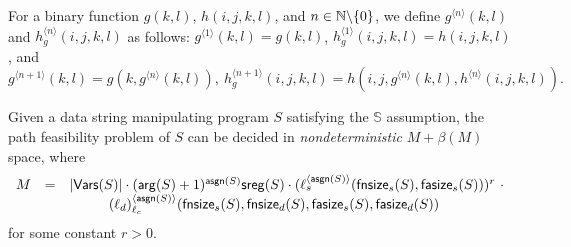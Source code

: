 For a binary function $g(k, l)$, $h(i, j, k, l)$, and $n \in \mathbb{N} \backslash \{0\}$, we define $g^{\langle n \rangle}(k, l)$ and $h^{\langle n \rangle}_g(i, j, k, l)$ as follows: $g^{\langle 1 \rangle}( k, l) = g(k, l)$, $h^{\langle 1 \rangle}_g(i, j, k, l) = h(i, j, k, l)$, and 
$$g^{\langle n+1 \rangle}( k, l) = g(k, g^{\langle n \rangle}( k, l)), \ h^{\langle n+1 \rangle}_g (i, j, k, l) = h(i, j, g^{\langle n \rangle}(k, l), h^{\langle n \rangle}(i, j, k, l)).$$


\begin{theorem}\label{thm-generic-dec-symbolic}
	Given a data string manipulating program $S$ satisfying the $\mathbb{S}$\prerec{} assumption, the path feasibility problem of $S$ can be decided in \emph{nondeterministic} $M+ \beta(M)$ space, where  
	\[
	\begin{array}{l c l}
		M & = & |\mathsf{Vars}(S)| \cdot (\mathsf{arg}(S)+1)^{\mathsf{asgn}(S)}  \mathsf{sreg}(S) \cdot  (\ell_s^{\langle \mathsf{asgn}(S) \rangle}(\mathsf{fnsize}_s(S), \mathsf{fasize}_s(S)))^{r}\ \cdot \\
		& &  \hspace{1cm} (\ell_d)^{\langle  \mathsf{asgn}(S) \rangle}_{\ell_c}(\mathsf{fnsize}_s(S),\mathsf{fnsize}_d(S),  \mathsf{fasize}_s(S), \mathsf{fasize}_d(S))
\end{array}
	\]
for some constant $r > 0$. 
\end{theorem}




